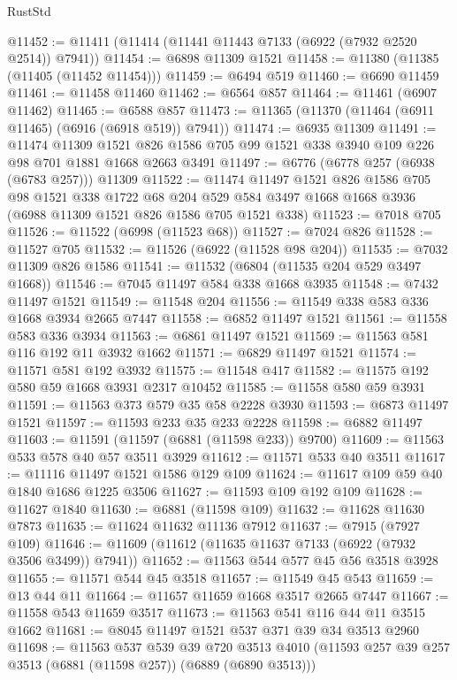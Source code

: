 \begin{lexlean}{RustStd}
\begin{coremodule}
@11452 := @11411 (@11414 (@11441 @11443 @7133 (@6922 (@7932 @2520 @2514)) @7941))
@11454 := @6898 @11309 @1521
@11458 := @11380 (@11385 (@11405 (@11452 @11454)))
@11459 := @6494 @519
@11460 := @6690 @11459
@11461 := @11458 @11460
@11462 := @6564 @857
@11464 := @11461 (@6907 @11462)
@11465 := @6588 @857
@11473 := @11365 (@11370 (@11464 (@6911 @11465) (@6916 (@6918 @519)) @7941))
@11474 := @6935 @11309
@11491 := @11474
    @11309
    @1521
    @826
    @1586
    @705
    @99
    @1521
    @338
    @3940
    @109
    @226
    @98
    @701
    @1881
    @1668
    @2663
    @3491
@11497 := @6776 (@6778 @257 (@6938 (@6783 @257))) @11309
@11522 := @11474
    @11497
    @1521
    @826
    @1586
    @705
    @98
    @1521
    @338
    @1722
    @68
    @204
    @529
    @584
    @3497
    @1668
    @1668
    @3936
    (@6988 @11309 @1521 @826 @1586 @705 @1521 @338)
@11523 := @7018 @705
@11526 := @11522 (@6998 (@11523 @68))
@11527 := @7024 @826
@11528 := @11527 @705
@11532 := @11526 (@6922 (@11528 @98 @204))
@11535 := @7032 @11309 @826 @1586
@11541 := @11532 (@6804 (@11535 @204 @529 @3497 @1668))
@11546 := @7045 @11497 @584 @338 @1668 @3935
@11548 := @7432 @11497 @1521
@11549 := @11548 @204
@11556 := @11549 @338 @583 @336 @1668 @3934 @2665 @7447
@11558 := @6852 @11497 @1521
@11561 := @11558 @583 @336 @3934
@11563 := @6861 @11497 @1521
@11569 := @11563 @581 @116 @192 @11 @3932 @1662
@11571 := @6829 @11497 @1521
@11574 := @11571 @581 @192 @3932
@11575 := @11548 @417
@11582 := @11575 @192 @580 @59 @1668 @3931 @2317 @10452
@11585 := @11558 @580 @59 @3931
@11591 := @11563 @373 @579 @35 @58 @2228 @3930
@11593 := @6873 @11497 @1521
@11597 := @11593 @233 @35 @233 @2228
@11598 := @6882 @11497
@11603 := @11591 (@11597 (@6881 (@11598 @233)) @9700)
@11609 := @11563 @533 @578 @40 @57 @3511 @3929
@11612 := @11571 @533 @40 @3511
@11617 := @11116 @11497 @1521 @1586 @129 @109
@11624 := @11617 @109 @59 @40 @1840 @1686 @1225 @3506
@11627 := @11593 @109 @192 @109
@11628 := @11627 @1840
@11630 := @6881 (@11598 @109)
@11632 := @11628 @11630 @7873
@11635 := @11624 @11632 @11136 @7912
@11637 := @7915 (@7927 @109)
@11646 := @11609 (@11612 (@11635 @11637 @7133 (@6922 (@7932 @3506 @3499)) @7941))
@11652 := @11563 @544 @577 @45 @56 @3518 @3928
@11655 := @11571 @544 @45 @3518
@11657 := @11549 @45 @543
@11659 := @13 @44 @11
@11664 := @11657 @11659 @1668 @3517 @2665 @7447
@11667 := @11558 @543 @11659 @3517
@11673 := @11563 @541 @116 @44 @11 @3515 @1662
@11681 := @8045 @11497 @1521 @537 @371 @39 @34 @3513 @2960
@11698 := @11563
    @537
    @539
    @39
    @720
    @3513
    @4010
    (@11593 @257 @39 @257 @3513 (@6881 (@11598 @257)) (@6889 (@6890 @3513)))

\end{coremodule}
\end{lexlean}
